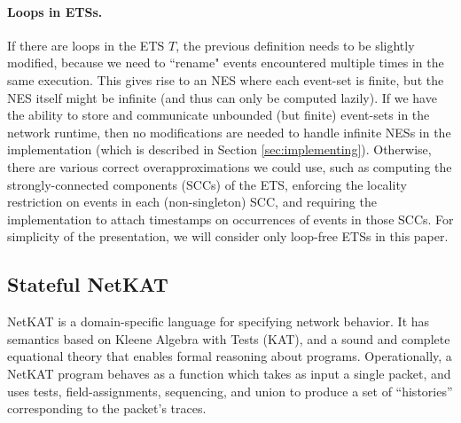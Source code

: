\documentclass[pldi-cameraready]{sigplanconf}
\begin{document}
\paragraph{Loops in ETSs.}
If there are loops in the ETS $T$, the previous definition needs to be
slightly modified, because we need to ``rename" events encountered
multiple times in the same execution. This gives rise to an NES where
each event-set is finite, but the NES itself might be infinite (and
thus can only be computed lazily). If we have the ability to
store and communicate unbounded (but finite) event-sets in the network
runtime, then no modifications are needed to handle infinite NESs in
the implementation (which is described in Section \ref{sec:implementing}).
Otherwise, there are various correct overapproximations we could use,
such as computing the
strongly-connected components (SCCs) of the ETS, enforcing the
locality restriction on events in each (non-singleton) SCC, and
requiring the implementation to attach timestamps on occurrences of
events in those SCCs. For simplicity of the presentation, we will consider only loop-free ETSs
in this paper.








\subsection{Stateful NetKAT}

NetKAT \cite{anderson2014netkat} is a domain-specific language for
specifying network behavior. It has semantics based on Kleene
Algebra with Tests (KAT), and a sound and complete equational theory
that enables formal reasoning about programs. Operationally, a NetKAT
program behaves as a function which takes as input a single packet,
and uses tests, field-assignments, sequencing, and union to produce a
set of ``histories'' corresponding to the packet's traces.
\end{document}
